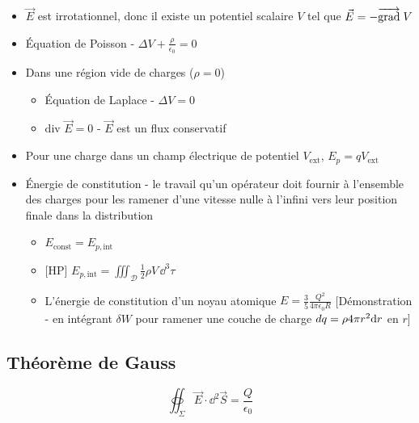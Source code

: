 \documentclass[openany]{book}
\begin{document}
\begin{itemize}
    \item $\vec{E}$ est irrotationnel, donc il existe un potentiel scalaire $V$ tel que $\vec{E} = -\overrightarrow{{\text{grad}}} \; V$
    \item Équation de Poisson - $\Delta V + \frac{\rho}{\epsilon_0} = 0$
    \item Dans une région vide de charges ($\rho = 0$)
    \begin{itemize}
        \item Équation de Laplace - $\Delta V = 0$
        \item $\text{div } \vec{E} = 0$ - $\vec{E}$ est un flux conservatif
    \end{itemize}
    \item Pour une charge dans un champ électrique de potentiel $V_{\text{ext}}$, $E_p = qV_{\text{ext}}$
    \item Énergie de constitution - le travail qu'un opérateur doit fournir à l'ensemble des charges pour les ramener d'une vitesse nulle à l'infini vers leur position finale dans la distribution 
    \begin{itemize}
        \item $E_{\text{const}} = E_{p,\text{int}}$
        \item{} [HP] $E_{p,\text{int}} = \iiint_{\mathcal{D}} \frac{1}{2} \rho V \, \dd^3 \tau$
        \item L'énergie de constitution d'un noyau atomique $E = \frac{3}{5} \frac{Q^2}{4 \pi \epsilon_0 R}$ [Démonstration - en intégrant $\delta W$ pour ramener une couche de charge $dq = \rho 4 \pi r^2 \text{d}r$ en $r$]
    \end{itemize}
\end{itemize}

\subsection{Théorème de Gauss}
\[ \oiint_\Sigma \vec{E} \cdot \dd^2 \vec{S} = \frac{Q}{\epsilon_0} \]
\end{document}
